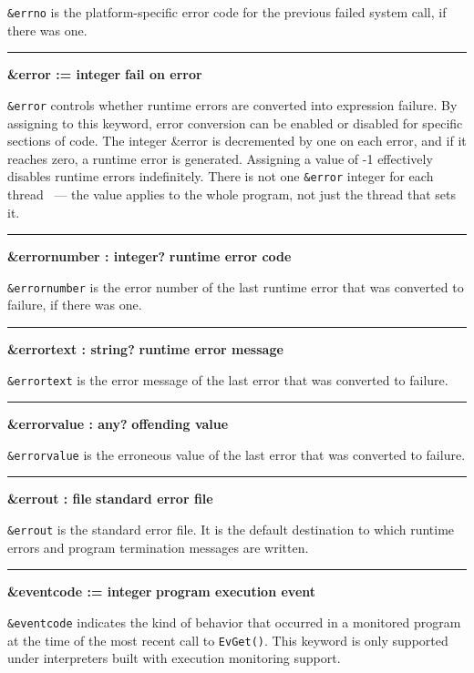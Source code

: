 \noindent
\texttt{\&errno} is the platform-specific error code for the previous
failed system call, if there was one.

\bigskip\hrule\vspace{0.1cm}
\noindent
{\bf \&error := integer } \hfill {\bf fail on error}

\noindent
{}\texttt{\&error} controls whether
runtime errors are converted into expression failure. By assigning to
this keyword, error conversion can be enabled or disabled for specific
sections of code. The integer \&error is decremented by one on each
error, and if it reaches zero, a runtime error is generated. Assigning
a value of -1 effectively disables runtime errors indefinitely. 
There is not one \texttt{\&error} integer for each thread \ConcurrencyIssue\
--- the value applies to the whole program, not just the thread that sets it.

\bigskip\hrule\vspace{0.1cm}
\noindent
{\bf \&errornumber : integer? } \hfill {\bf runtime error code}

\noindent
\texttt{\&errornumber} is the error number of the last runtime error
that was converted to failure, if there was one.

\bigskip\hrule\vspace{0.1cm}
\noindent
{\bf \&errortext : string? } \hfill {\bf runtime error message}

\noindent
{}\texttt{\&errortext} is the error
message of the last error that was converted to failure.

\bigskip\hrule\vspace{0.1cm}
\noindent
{\bf \&errorvalue : any? } \hfill {\bf offending value}

\noindent
\texttt{\&errorvalue} is the erroneous value of the last error that was
converted to failure.

\bigskip\hrule\vspace{0.1cm}
\noindent
{\bf \&errout : file } \hfill {\bf standard error file}

\noindent
{}\texttt{\&errout} is the standard
error file. It is the default destination to which runtime errors and
program termination messages are written.

\bigskip\hrule\vspace{0.1cm}
\noindent
{\bf \&eventcode := integer } \hfill {\bf program execution event}

\noindent
{}\texttt{\&eventcode} indicates the
kind of behavior that occurred in a monitored program at the time of
the most recent call to \texttt{EvGet()}. This keyword is only
supported under interpreters built with execution monitoring support.

